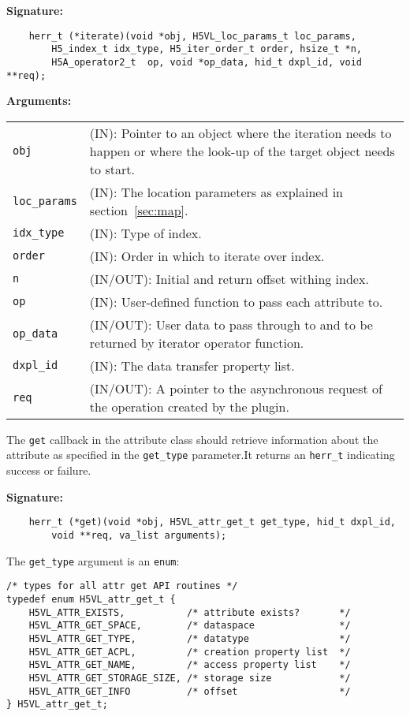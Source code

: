 \textbf{Signature:}
\begin{lstlisting}
    herr_t (*iterate)(void *obj, H5VL_loc_params_t loc_params,
        H5_index_t idx_type, H5_iter_order_t order, hsize_t *n, 
        H5A_operator2_t  op, void *op_data, hid_t dxpl_id, void **req);
\end{lstlisting}

\textbf{Arguments:}\\
\begin{tabular}{l p{10cm}}
  {\tt obj} & (IN): Pointer to an object where the iteration needs
  to happen or where the look-up of the target object needs to
  start.\\
  {\tt loc\_params} & (IN): The location parameters as
  explained in section~\ref{sec:map}.\\
  {\tt idx\_type} & (IN): Type of index.\\
  {\tt order} & (IN): Order in which to iterate over index.\\
  {\tt n} & (IN/OUT): Initial and return offset withing index.\\
  {\tt op} & (IN): User-defined function to pass each
  attribute to. \\
  {\tt op\_data} & (IN/OUT): User data to pass through to and to be
  returned by iterator operator function. \\
  {\tt dxpl\_id} & (IN): The data transfer property list.\\
  {\tt req} & (IN/OUT): A pointer to the asynchronous request of the
  operation created by the plugin.\\
\end{tabular}

The {\tt get} callback in the attribute class should retrieve
information about the attribute as specified in the {\tt get\_type}
parameter.It returns an {\tt herr\_t} indicating success or failure.

\textbf{Signature:}
\begin{lstlisting}
    herr_t (*get)(void *obj, H5VL_attr_get_t get_type, hid_t dxpl_id, 
        void **req, va_list arguments);
\end{lstlisting}

The {\tt get\_type} argument is an {\tt enum}:
\begin{lstlisting}
/* types for all attr get API routines */
typedef enum H5VL_attr_get_t {
    H5VL_ATTR_EXISTS,           /* attribute exists?       */
    H5VL_ATTR_GET_SPACE,        /* dataspace               */
    H5VL_ATTR_GET_TYPE,         /* datatype                */
    H5VL_ATTR_GET_ACPL,         /* creation property list  */
    H5VL_ATTR_GET_NAME,         /* access property list    */
    H5VL_ATTR_GET_STORAGE_SIZE, /* storage size            */
    H5VL_ATTR_GET_INFO          /* offset                  */
} H5VL_attr_get_t;
\end{lstlisting}

